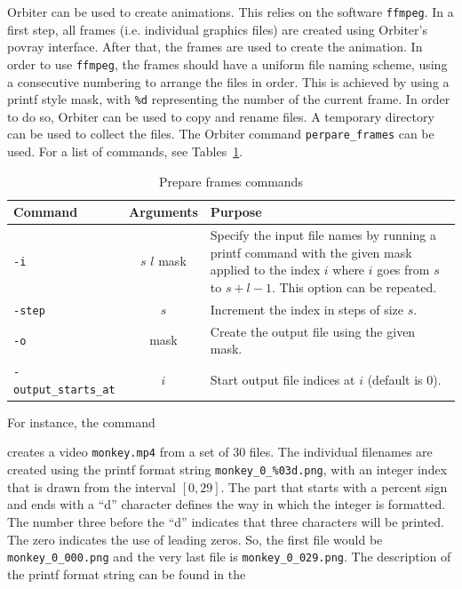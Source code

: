 \bigskip

Orbiter can be used to create animations. 
This relies on the software \verb'ffmpeg'.
In a first step, all frames (i.e. individual graphics files) are created using Orbiter's povray interface. 
After that, the frames are used to create the animation. 
In order to use \verb'ffmpeg', the frames should have a uniform file naming scheme, 
using a consecutive numbering to arrange the files in order. 
This is achieved by using a printf style mask, with \verb'%d' representing the number of the current frame.
In order to do so, Orbiter can be used to copy and rename files. 
A temporary directory can be used to collect the files.
The Orbiter command \verb'perpare_frames' can be used. For a list of commands, see Tables~\ref{tab:prepareframes}.
	\begin{table}
	\begin{center}
	\begin{tabular}{|p{4.5cm}|c|p{8cm}|}
		\hline
		Command & Arguments & Purpose \\
		\hline
		\hline
		\verb'-i' & $s$ $l$ mask & Specify the input file names 
by running a printf command with the given mask applied to the index $i$ where $i$ goes from $s$ to $s+l-1.$ This option can be repeated. \\
		\hline
		\verb'-step' & $s$  & Increment the index in steps of size $s$. \\
		\hline
		\verb'-o' & mask & Create the output file using the given mask.\\
		\hline
		\verb'-output_starts_at' & $i$ & Start output file indices at $i$ (default is 0).\\
		\hline
		\end{tabular}
	\end{center}
	\caption{\label{tab:prepareframes}Prepare frames commands}
	\end{table}
For instance, the command 
{\tt

}
creates a video \verb'monkey.mp4' from a set of 30 files. The individual 
filenames are created using the printf format string \verb'monkey_0_%03d.png', 
with an integer index that is drawn from the interval $[0,29].$ 
The part that starts with a percent sign and ends with a ``d'' character
defines the way in which the integer is formatted. 
The number three before the ``d'' indicates 
that three characters will be printed. 
The zero indicates the use of leading zeros.
So, the first file would be \verb'monkey_0_000.png' 
and the very last file is \verb'monkey_0_029.png'. 
The description of the printf format string can be found in the 
